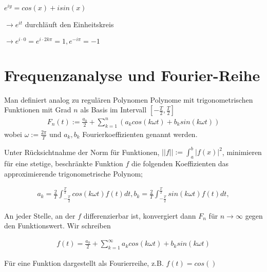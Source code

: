 \begin{satz}
	$e^{iy} = cos(x) + i sin(x)$
	
	\begin{description}[noitemsep]
		\item $\rightarrow e^{it}$ durchläuft den Einheitskreis 
		\item $\rightarrow e^{i \cdot 0} = e^{i \cdot 2k\pi} = 1, e^{-i\pi} = -1$
	\end{description}
	
\end{satz}

\pagebreak

\section{Frequenzanalyse und Fourier-Reihe}
\begin{definition}
	Man definiert analog zu regulären Polynomen Polynome mit trigonometrischen Funktionen mit Grad $n$ als Basis im Intervall $[-\frac{T}{2}, \frac{T}{2}]$ 
	\begin{align*}
		F_n(t) := \frac{a_0}{2} + \sum_{k=1}^{n} (a_k cos(k\omega t) + b_k sin(k \omega t))
	\end{align*}
	wobei $\omega := \frac{2 \pi}{T}$ und $a_k, b_k$ Fourierkoeffizienten genannt werden.
\end{definition}

\begin{satz}
	Unter Rücksichtnahme der Norm für Funktionen, $||f|| := \int_a^b |f(x)|^2$, minimieren für eine stetige, beschränkte Funktion $f$ die folgenden Koeffizienten das approximierende trigonometrische Polynom;
	
	\begin{align*}
		a_k = \frac{2}{T} \int_{-\frac{T}{2}}^{\frac{T}{2}} cos(k \omega t)f(t) dt,
		b_k = \frac{2}{T} \int_{-\frac{T}{2}}^{\frac{T}{2}} sin(k \omega t)f(t) dt,	
	\end{align*}
	
	An jeder Stelle, an der $f$ differenzierbar ist, konvergiert dann $F_n$ für $n \rightarrow \infty$ gegen den Funktionswert. Wir schreiben
	
	\begin{align*}
		f(t) = \frac{a_0}{2} + \sum_{k=1}^{\infty}a_k cos(k \omega t) + b_k sin(k \omega t)
	\end{align*}
\end{satz}

\begin{definition}[Spektrum]
	Für eine Funktion dargestellt als Fourierreihe, z.B. $f(t) = cos()$
\end{definition}

